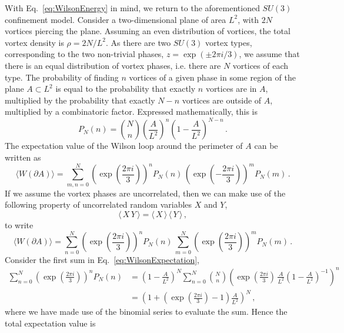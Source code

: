 With Eq.~\eqref{eq:WilsonEnergy} in mind, we return to the aforementioned $SU(3)$ confinement model. Consider a two-dimensional plane of area $L^2$, with $2N$ vortices piercing the plane. Assuming an even distribution of vortices, the total vortex density is $\rho = 2N/L^2$. As there are two $SU(3)$ vortex types, corresponding to the two non-trivial phases, $z=\exp\left(\pm 2\pi i/3\right)$, we assume that there is an equal distribution of vortex phases, i.e. there are $N$ vortices of each type. The probability of finding $n$ vortices of a given phase in some region of the plane $A\subset L^2$ is equal to the probability that exactly $n$ vortices are in $A$, multiplied by the probability that exactly $N-n$ vortices are outside of $A$, multiplied by a combinatoric factor. Expressed mathematically, this is
%
\begin{equation}
P_N(n) = \binom{N}{n} \left(\frac{A}{L^2}\right)^n \left(1-\frac{A}{L^2}\right)^{N-n}\, .
\end{equation}
%
The expectation value of the Wilson loop around the perimeter of $A$ can be written as
%
\begin{equation}
\langle W(\partial A)\rangle = \sum_{m,n = 0}^N \left(\exp\left(\frac{2\pi i}{3}\right)\right)^n P_N(n)\, \left(\exp\left(-\frac{2\pi i}{3}\right)\right)^m P_N(m)\, .
\end{equation}
%
If we assume the vortex phases are uncorrelated, then we can make use of the following property of uncorrelated random variables $X$ and $Y$,
%
\begin{equation}
\langle\,X\,Y\,\rangle = \langle\,X\,\rangle\,\langle\,Y\,\rangle\, ,
\end{equation}
%
to write
%
\begin{equation}
\langle W(\partial A)\rangle = \sum_{n=0}^N \left(\exp\left(\frac{2\pi i}{3}\right)\right)^n P_N(n)\,\sum_{m=0}^N \left(\exp\left(\frac{2\pi i}{3}\right)\right)^m P_N(m)\, .
\label{eq:WilsonExpectation}
\end{equation}
%
Consider the first sum in Eq.~\eqref{eq:WilsonExpectation},
%
\begin{align}
\sum_{n=0}^N \left(\exp\left(\frac{2\pi i}{3}\right)\right)^n P_N(n) & = \left(1-\frac{A}{L^2}\right)^{N}\sum_{n=0}^{N} \binom{N}{n} \left(\exp\left(\frac{2\pi i}{3}\right)\,\frac{A}{L^2}\left(1-\frac{A}{L^2}\right)^{-1}\right)^n\nonumber\\
&=\left(1+\left(\exp\left(\frac{2\pi i}{3}\right) - 1\right)\frac{A}{L^2}\right)^N\, ,
\end{align}
%
where we have made use of the binomial series to evaluate the sum. Hence the total expectation value is
